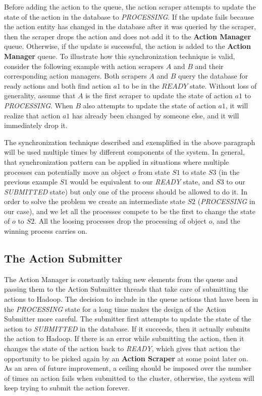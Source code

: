 Before adding the action to the queue, the action scraper attempts to update the state of the action in the database to \textit{PROCESSING}. If the update fails because the action entity has changed in the database after it was queried by the scraper, then the scraper drops the action and does not add it to the \textbf{Action Manager} queue. Otherwise, if the update is successful, the action is added to the \textbf{Action Manager} queue. To illustrate how this synchronization technique is valid, consider the following example with action scrapers $A$ and $B$ and their corresponding action managers. Both scrapers $A$ and $B$ query the database for ready actions and both find action $a1$ to be in the $READY$ state. Without loss of generality, assume that $A$ is the first scraper to update the state of action $a1$ to \textit{PROCESSING}. When $B$ also attempts to update the state of action $a1$, it will realize that action $a1$ has already been changed by someone else, and it will immediately drop it.

The synchronization technique described and exemplified in the above paragraph will be used multiple times by different components of the system. In general, that synchronization pattern can be applied in situations where multiple processes can potentially move an object $o$ from state $S1$ to state $S3$ (in the previous example $S1$ would be equivalent to our \textit{READY} state, and $S3$ to our \textit{SUBMITTED} state) but only one of the process should be allowed to do it. In order to solve the problem we create an intermediate state $S2$ (\textit{PROCESSING} in our case), and we let all the processes compete to be the first to change the state of $o$ to $S2$. All the loosing processes drop the processing of object $o$, and the winning process carries on.

\subsection{The Action Submitter}
The Action Manager is constantly taking new elements from the queue and passing them to the Action Submitter threads that take care of submitting the actions to Hadoop. The decision to include in the queue actions that have been in the \textit{PROCESSING} state for a long time makes the design of the Action Submitter more careful. The submitter first attempts to update the state of the action to \textit{SUBMITTED} in the database. If it succeeds, then it actually submits the action to Hadoop. If there is an error while submitting the action, then it changes the state of the action back to \textit{READY}, which gives that action the opportunity to be picked again by an \textbf{Action Scraper} at some point later on. As an area of future improvement, a ceiling should be imposed over the number of times an action fails when submitted to the cluster, otherwise, the system will keep trying to submit the action forever.

